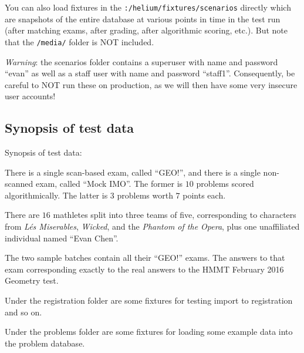 You can also load fixtures in the \verb+:/helium/fixtures/scenarios+ directly
which are snapshots of the entire database at various points in time
in the test run
(after matching exams, after grading, after algorithmic scoring, etc.).
But note that the \verb+/media/+ folder is NOT included.

\emph{Warning}: the scenarios folder contains a superuser
with name and password ``evan''
as well as a staff user with name and password ``staff1''.
Consequently, be careful to NOT run these on production,
as we will then have some very insecure user accounts!

\subsection{Synopsis of test data}
Synopsis of test data:

\begin{itemize}
\ii There is a single scan-based exam, called ``GEO!'',
and there is a single non-scanned exam, called ``Mock IMO''.
The former is $10$ problems scored algorithmically.
The latter is $3$ problems worth $7$ points each.

\ii There are $16$ mathletes split into three teams of five,
corresponding to characters from \emph{L\'es Miserables},
\emph{Wicked}, and the \emph{Phantom of the Opera},
plus one unaffiliated individual named ``Evan Chen''.

\ii The two sample batches contain all their ``GEO!'' exams.
The answers to that exam corresponding exactly to the real answers
to the HMMT February 2016 Geometry test.

\ii Under the registration folder are some fixtures for testing
import to registration and so on.

\ii Under the problems folder are some fixtures for loading
some example data into the problem database.
\end{itemize}


